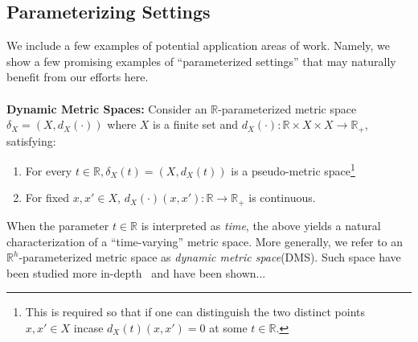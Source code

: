 \documentclass[10pt]{article}
\numberwithin{equation}{section}
\newcommand{\+}{%
	\raisebox{0.18ex}{\scaleobj{0.55}{+}}
}
\theoremstyle{definition}
\theoremstyle{definition}
\begin{document}
\subsection*{Parameterizing Settings}
We include a few examples of potential application areas of work. Namely, we show a few promising examples of ``parameterized settings'' that may naturally benefit from our efforts here.
\\
\\ 
\textbf{Dynamic Metric Spaces:} Consider an $\mathbb{R}$-parameterized metric space $\delta_X = ( X, d_X(\cdot) )$ where $X$ is a finite set and $d_X(\cdot): \mathbb{R} \times X \times X \to \mathbb{R}_{+}$, satisfying: 
\begin{enumerate}
	\item For every $t \in \mathbb{R}, \delta_X(t) = (X, d_X(t))$ is a pseudo-metric space\footnote{This is required so that if one can distinguish the two distinct points $x, x' \in X$ incase $d_X(t)(x, x') = 0$ at some $t \in \mathbb{R}$. } 
	\item For fixed $x, x' \in X$, $d_X(\cdot)(x, x'): \mathbb{R} \to \mathbb{R}_{+}$ is continuous.
\end{enumerate}
When the parameter $t \in \mathbb{R}$ is interpreted as \emph{time}, the above yields a natural characterization of a ``time-varying'' metric space. More generally, we refer to an $\mathbb{R}^h$-parameterized metric space as \emph{dynamic metric space}(DMS). 
Such space have been studied more in-depth~\cite{} and have been shown...


\end{document}
